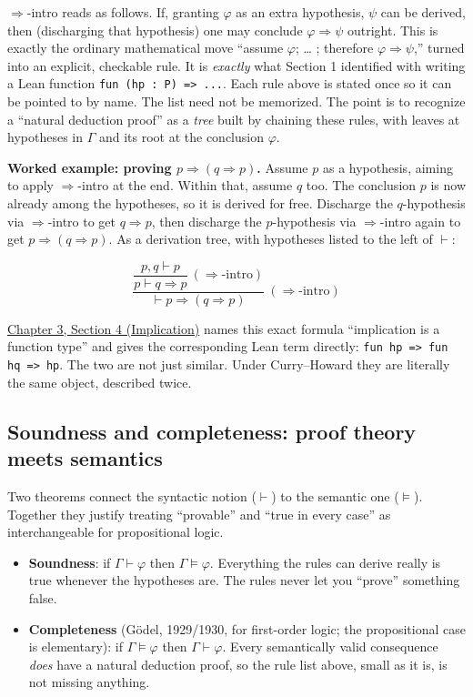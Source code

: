 \(\Rightarrow\)-intro reads as follows. If, granting \(\varphi\) as an extra hypothesis, \(\psi\) can be derived, then (discharging that hypothesis) one may conclude \(\varphi \Rightarrow \psi\) outright. This is exactly the ordinary mathematical move ``assume \(\varphi\); \ldots{} ; therefore \(\varphi \Rightarrow \psi\),'' turned into an explicit, checkable rule. It is \emph{exactly} what Section 1 identified with writing a Lean function \texttt{fun (hp : P) => ...}. Each rule above is stated once so it can be pointed to by name. The list need not be memorized. The point is to recognize a ``natural deduction proof'' as a \emph{tree} built by chaining these rules, with leaves at hypotheses in \(\Gamma\) and its root at the conclusion \(\varphi\).

\textbf{Worked example: proving \(p \Rightarrow (q \Rightarrow p)\).} Assume \(p\) as a hypothesis, aiming to apply \(\Rightarrow\)-intro at the end. Within that, assume \(q\) too. The conclusion \(p\) is now already among the hypotheses, so it is derived for free. Discharge the \(q\)-hypothesis via \(\Rightarrow\)-intro to get \(q \Rightarrow p\), then discharge the \(p\)-hypothesis via \(\Rightarrow\)-intro again to get \(p \Rightarrow (q \Rightarrow p)\). As a derivation tree, with hypotheses listed to the left of \(\vdash\):

\[
\dfrac{\dfrac{p, q \vdash p}{p \vdash q \Rightarrow p}\ (\Rightarrow\text{-intro})}
{\vdash p \Rightarrow (q \Rightarrow p)}\ (\Rightarrow\text{-intro})
\]

\hyperref[sec:03-propositions-and-proofs:04-implication:1]{Chapter 3, Section 4 (Implication)} names this exact formula ``implication is a function type'' and gives the corresponding Lean term directly: \texttt{fun hp => fun hq => hp}. The two are not just similar. Under Curry--Howard they are literally the same object, described twice.

\subsection{Soundness and completeness: proof theory meets semantics}\label{sec:03-propositions-and-proofs:02-logic-recap:5}

Two theorems connect the syntactic notion (\(\vdash\)) to the semantic one (\(\models\)). Together they justify treating ``provable'' and ``true in every case'' as interchangeable for propositional logic.

\begin{itemize}
\tightlist
\item
  \textbf{Soundness}: if \(\Gamma \vdash \varphi\) then \(\Gamma \models \varphi\). Everything the rules can derive really is true whenever the hypotheses are. The rules never let you ``prove'' something false.
\item
  \textbf{Completeness} (Gödel, 1929/1930, for first-order logic; the propositional case is elementary): if \(\Gamma \models \varphi\) then \(\Gamma \vdash \varphi\). Every semantically valid consequence \emph{does} have a natural deduction proof, so the rule list above, small as it is, is not missing anything.
\end{itemize}

